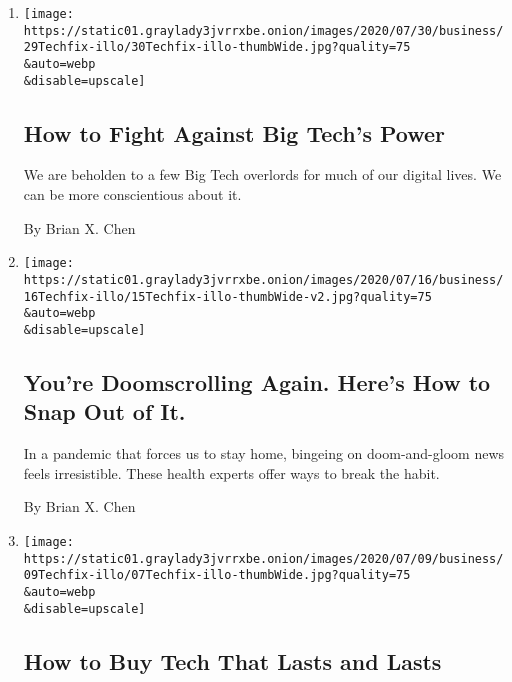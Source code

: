 \begin{enumerate}
\def\labelenumi{\arabic{enumi}.}
\item
  \href{/2020/07/29/technology/personaltech/big-tech-power-how-to-fight.html}{}

  \texttt{[image: https://static01.graylady3jvrrxbe.onion/images/2020/07/30/business/29Techfix-illo/30Techfix-illo-thumbWide.jpg?quality=75\\\&auto=webp\\\&disable=upscale]}

  \hypertarget{how-to-fight-against-big-techs-power}{%
  \subsection{How to Fight Against Big Tech's
  Power}\label{how-to-fight-against-big-techs-power}}

  We are beholden to a few Big Tech overlords for much of our digital
  lives. We can be more conscientious about it.

  By Brian X. Chen
\item
  \href{/2020/07/15/technology/personaltech/youre-doomscrolling-again-heres-how-to-snap-out-of-it.html}{}

  \texttt{[image: https://static01.graylady3jvrrxbe.onion/images/2020/07/16/business/16Techfix-illo/15Techfix-illo-thumbWide-v2.jpg?quality=75\\\&auto=webp\\\&disable=upscale]}

  \hypertarget{youre-doomscrolling-again-heres-how-to-snap-out-of-it}{%
  \subsection{You're Doomscrolling Again. Here's How to Snap Out of
  It.}\label{youre-doomscrolling-again-heres-how-to-snap-out-of-it}}

  In a pandemic that forces us to stay home, bingeing on doom-and-gloom
  news feels irresistible. These health experts offer ways to break the
  habit.

  By Brian X. Chen
\item
  \href{/2020/07/08/technology/personaltech/tech-that-lasts.html}{}

  \texttt{[image: https://static01.graylady3jvrrxbe.onion/images/2020/07/09/business/09Techfix-illo/07Techfix-illo-thumbWide.jpg?quality=75\\\&auto=webp\\\&disable=upscale]}

  \hypertarget{how-to-buy-tech-that-lasts-and-lasts}{%
  \subsection{How to Buy Tech That Lasts and
  Lasts}\label{how-to-buy-tech-that-lasts-and-lasts}}


\end{enumerate}
